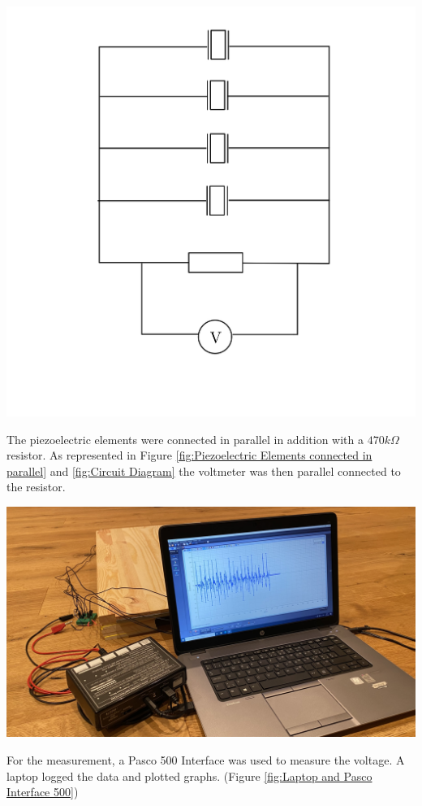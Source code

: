 \begin{minipage}{0.33\textwidth}
    \includegraphics[width=\textwidth]{./Figure_9.jpg}
    \label{fig:Circuit Diagram}
\end{minipage}
\begin{minipage}{0.33\textwidth}
    The piezoelectric elements were connected in parallel in addition with a $470k\Omega$ resistor. As represented in Figure \ref{fig:Piezoelectric Elements connected in parallel} and \ref{fig:Circuit Diagram} the voltmeter was then parallel connected to the resistor.\\
\end{minipage}
\begin{minipage}{0.33\textwidth}
    \includegraphics[width=\textwidth]{./Figure_10.jpg}
    \label{fig:Laptop and Pasco Interface 500}
\end{minipage}
\begin{minipage}{0.66\textwidth}
    For the measurement, a Pasco 500 Interface was used to measure the voltage. A laptop logged the data and plotted graphs. (Figure \ref{fig:Laptop and Pasco Interface 500})
\end{minipage}
